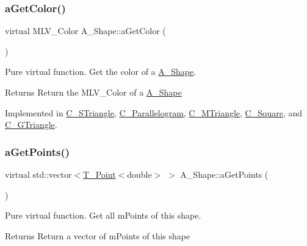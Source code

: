 \subsubsection{\texorpdfstring{a\+Get\+Color()}{aGetColor()}}
{\footnotesize\ttfamily virtual M\+L\+V\+\_\+\+Color A\+\_\+\+Shape\+::a\+Get\+Color (\begin{DoxyParamCaption}{ }\end{DoxyParamCaption})\hspace{0.3cm}{\ttfamily [pure virtual]}}



Pure virtual function. Get the color of a \hyperlink{classA__Shape}{A\+\_\+\+Shape}. 

\begin{DoxyReturn}{Returns}
Return the M\+L\+V\+\_\+\+Color of a \hyperlink{classA__Shape}{A\+\_\+\+Shape} 
\end{DoxyReturn}


Implemented in \hyperlink{classC__STriangle_a1a0c315653ece65118705648d09336dd}{C\+\_\+\+S\+Triangle}, \hyperlink{classC__Parallelogram_afd5055e948fcd992be3cdd227c8b4bfb}{C\+\_\+\+Parallelogram}, \hyperlink{classC__MTriangle_aa567d77ce0e6d664beb6eea9268b1bc3}{C\+\_\+\+M\+Triangle}, \hyperlink{classC__Square_a44b1e58b20cc98edc774a73742fec9a7}{C\+\_\+\+Square}, and \hyperlink{classC__GTriangle_a19100d603f9239fd66f1115c4358f0fc}{C\+\_\+\+G\+Triangle}.

\mbox{\label{classA__Shape_a9fd1285bd63b1fc88943c9969bf01a5c}} 
\subsubsection{\texorpdfstring{a\+Get\+Points()}{aGetPoints()}}
{\footnotesize\ttfamily virtual std\+::vector$<$\hyperlink{classT__Point}{T\+\_\+\+Point}$<$double$>$ $>$ A\+\_\+\+Shape\+::a\+Get\+Points (\begin{DoxyParamCaption}{ }\end{DoxyParamCaption})\hspace{0.3cm}{\ttfamily [pure virtual]}}



Pure virtual function. Get all m\+Points of this shape. 

\begin{DoxyReturn}{Returns}
Return a vector of m\+Points of this shape 
\end{DoxyReturn}


